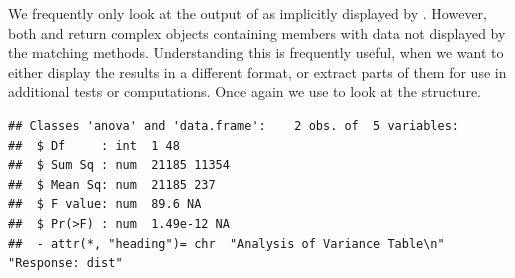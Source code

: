 \documentclass[krantz2]{krantz}\usepackage{knitr}
\begin{document}
\begin{explainbox}
We frequently only look at the output of  as implicitly displayed by . However, both  and  return complex objects containing members with data not displayed by the matching  methods. Understanding this is frequently useful, when we want to either display the results in a different format, or extract parts of them for use in additional tests or computations. Once again we use  to look at the structure.

\begin{knitrout}\footnotesize
{}\color{fgcolor}\begin{kframe}
\begin{alltt}
\hlstd{(}
\end{alltt}
\begin{verbatim}
## Classes 'anova' and 'data.frame':	2 obs. of  5 variables:
##  $ Df     : int  1 48
##  $ Sum Sq : num  21185 11354
##  $ Mean Sq: num  21185 237
##  $ F value: num  89.6 NA
##  $ Pr(>F) : num  1.49e-12 NA
##  - attr(*, "heading")= chr  "Analysis of Variance Table\n" "Response: dist"
\end{verbatim}
\end{kframe}
\end{knitrout}


\end{explainbox}
\end{document}
